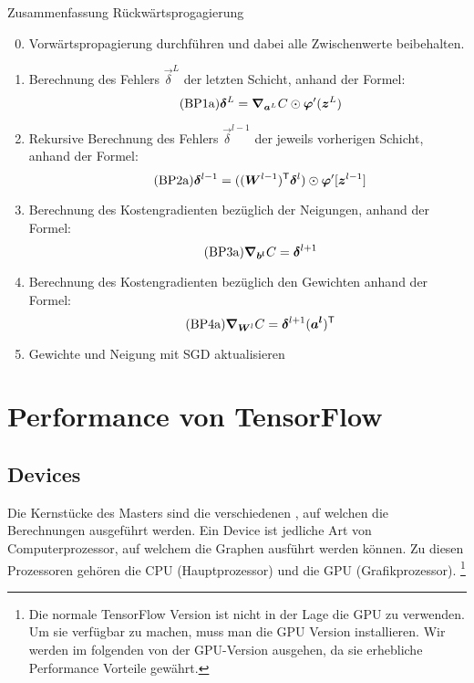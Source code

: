 \begin{appendices}
\begin{graybox}{Zusammenfassung Rückwärtsprogagierung}
  \begin{enumerate}
    \setcounter{enumi}{-1}
  \item{Vorwärtspropagierung durchführen und dabei alle Zwischenwerte beibehalten.}
    \item{Berechnung des Fehlers $\vec{\delta}^L$ der letzten Schicht, anhand
        der Formel:
      \begin{equation}\tag{BP1a}
        \bm{\delta}^L = \bm{\nabla}_{\bm{a}^L}C \odot \bm{\varphi}'(\bm{z}^L)
      \end{equation}
      }
      \item{Rekursive Berechnung des Fehlers $\vec{\delta}^{l-1}$ der jeweils
          vorherigen Schicht, anhand der Formel:
          \begin{equation}\tag{BP2a}
            \bm{\delta}^{l-1} = ((\bm{W}^{l-1})^{\mathsf{T}} \bm{\delta}^l) \odot \bm{\varphi}'[\bm{z}^{l-1}]
          \end{equation}
        }
      \item{Berechnung des Kostengradienten bezüglich der Neigungen, anhand der Formel:
          \begin{equation}\tag{BP3a}
            \bm{\nabla}_{\bm{b^l}} C =  \bm{\delta}^{l+1}
          \end{equation}
        }
      \item{Berechnung des Kostengradienten bezüglich den Gewichten anhand der Formel:
          \begin{equation}\tag{BP4a}
            \bm{\nabla}_{\bm{W}^l} C = \bm{\delta}^{l+1} (\bm{a^l})^{\mathsf{T}}
          \end{equation}
        }
      \item{Gewichte und Neigung mit SGD aktualisieren}
  \end{enumerate}
\end{graybox}

\para{}
\cite{Nielsen}
\cite{rojas}
\cite{ma:deep_learning}

\chapter{Performance von TensorFlow}\label{sec:anhang_tf}
\section*{Devices}
Die Kernstücke des Masters sind die verschiedenen , auf
welchen die Berechnungen ausgeführt werden. Ein Device ist jedliche Art von
Computerprozessor, auf welchem die Graphen ausführt werden können.
Zu diesen Prozessoren gehören die CPU (Hauptprozessor) und die GPU (Grafikprozessor).
\footnote{
  Die normale TensorFlow Version ist nicht in der Lage die GPU zu verwenden. Um
  sie verfügbar zu machen, muss man die GPU Version installieren. Wir werden im folgenden
  von der GPU-Version ausgehen, da sie erhebliche Performance Vorteile gewährt.
}
\para{}


\end{appendices}
